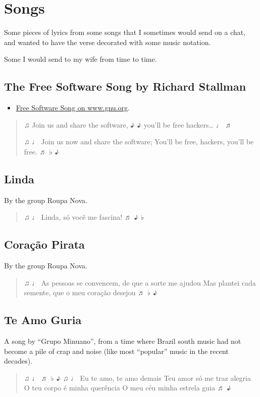 \documentclass[11pt]{article}
\begin{document}
\section{Songs}
\label{sec:org49178cd}

Some pieces of lyrics from some songs that I sometimes would send on a
chat, and wanted to have the verse decorated with some music notation.

Some I would send to my wife from time to time.

\subsection{The Free Software Song by Richard Stallman}
\label{sec:org5eb002d}

\begin{itemize}
\item \href{https://www.gnu.org/music/free-software-song.en.html}{Free Software Song on www.gnu.org}.
\end{itemize}

\begin{quote}
♫ Join us and share the software, ♪
♪ you'll be free hackers\ldots{} ♩ ♬

♫ ♩ Join us now and share the software; You'll be free, hackers, you'll be free. ♬ ♭ ♪
\end{quote}

\subsection{Linda}
\label{sec:org8eef038}

By the group Roupa Nova.

\begin{quote}
♫ ♩ Linda, só você me fascina! ♬ ♪ ♭
\end{quote}

\subsection{Coração Pirata}
\label{sec:org699a5c0}

By the group Roupa Nova.

\begin{quote}
♫ ♩
As pessoas se convencem, de que a sorte me ajudou
Mas plantei cada semente, que o meu coração desejou
♬ ♭ ♪
\end{quote}

\subsection{Te Amo Guria}
\label{sec:org856ee53}

A song by “Grupo Minuano”, from a time where Brazil south music had
not become a pile of crap and noise (like most “popular” music in the
recent decades).

\begin{quote}
♫ ♩ ♬ ♭ ♪
♫ ♩ Eu te amo, te amo demais
Teu amor só me traz alegria
O teu corpo é minha querência
O meu céu minha estrela guia ♬ ♪
\end{quote}
\end{document}

